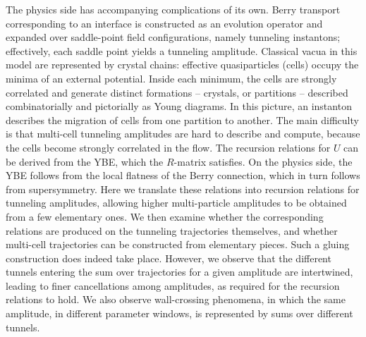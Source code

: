 \documentclass[10pt]{article}
\theoremstyle{definition}
\numberwithin{equation}{section}
\begin{document}
The physics side has accompanying complications of its own.
Berry transport corresponding to an interface is constructed as an evolution operator and expanded over saddle-point field configurations, namely tunneling instantons; effectively, each saddle point yields a tunneling amplitude.
Classical vacua in this model are represented by crystal chains: effective quasiparticles (cells) occupy the minima of an external potential.
Inside each minimum, the cells are strongly correlated and generate distinct formations -- crystals, or partitions \cite{Okounkov:2003sp,Ooguri:2009ijd,Li:2020rij,Bao:2024ygr} -- described combinatorially and pictorially as Young diagrams.
In this picture, an instanton describes the migration of cells from one partition to another.
The main difficulty is that multi-cell tunneling amplitudes are hard to describe and compute, because the cells become strongly correlated in the flow.
The recursion relations for $U$ can be derived from the YBE, which the $R$-matrix satisfies.
On the physics side, the YBE follows from the local flatness of the Berry connection, which in turn follows from supersymmetry.
Here we translate these relations into recursion relations for tunneling amplitudes, allowing higher multi-particle amplitudes to be obtained from a few elementary ones.
We then examine whether the corresponding relations are produced on the tunneling trajectories themselves, and whether multi-cell trajectories can be constructed from elementary pieces.
Such a gluing construction does indeed take place.
However, we observe that the different tunnels entering the sum over trajectories for a given amplitude are intertwined, leading to finer cancellations among amplitudes, as required for the recursion relations to hold.
We also observe wall-crossing phenomena, in which the same amplitude, in different parameter windows, is represented by sums over different tunnels.
\end{document}

